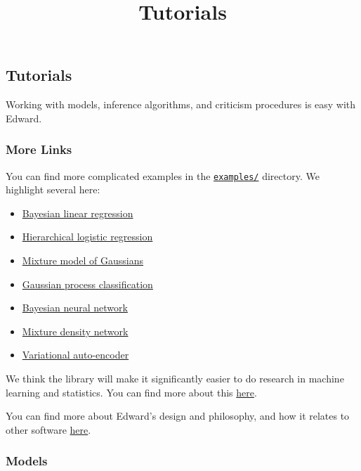 \title{Tutorials}

\subsection{Tutorials}
Working with models, inference algorithms, and criticism procedures is easy with
Edward.

\subsubsection{More Links}\label{more-links}

You can find more complicated examples in the
\href{https://github.com/blei-lab/edward/tree/master/examples}{\texttt{examples/}}
directory. We highlight several here:

\begin{itemize}
\tightlist
\item
  \href{https://github.com/blei-lab/edward/blob/master/examples/bayesian_linear_regression.py}{Bayesian
  linear regression}
\item
  \href{https://github.com/blei-lab/edward/blob/master/examples/hierarchical_logistic_regression.py}{Hierarchical
  logistic regression}
\item
  \href{https://github.com/blei-lab/edward/blob/master/examples/mixture_gaussian.py}{Mixture
  model of Gaussians}
\item
  \href{https://github.com/blei-lab/edward/blob/master/examples/gp_classification.py}{Gaussian
  process classification}
\item
  \href{https://github.com/blei-lab/edward/blob/master/examples/bayesian_nn.py}{Bayesian
  neural network}
\item
  \href{https://github.com/blei-lab/edward/blob/master/examples/mixture_density_network.py}{Mixture
  density network}
\item
  \href{https://github.com/blei-lab/edward/blob/master/examples/convolutional_vae.py}{Variational
  auto-encoder}
\end{itemize}

We think the library will make it significantly easier to do research in
machine learning and statistics. You can find more about this
\href{guide-research.md}{here}.

You can find more about Edward's design and philosophy, and how it
relates to other software \href{design.md}{here}.

\subsubsection{Models}

